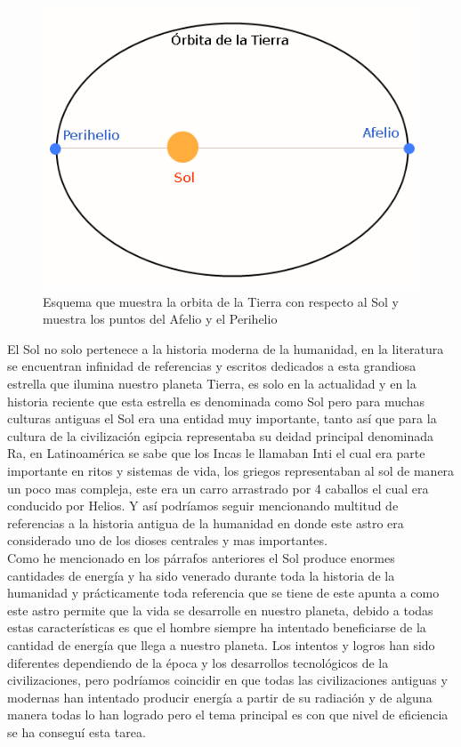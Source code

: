 \begin{figure}[h!]
        \centering
        \includegraphics[scale=0.4]{images/afelioPerihelio}
        \caption{\tiny Esquema que muestra la orbita de la Tierra con respecto al Sol y muestra los puntos del Afelio y el Perihelio}
\end{figure}

El Sol no solo pertenece a la historia moderna de la humanidad, en la literatura se encuentran infinidad de referencias y escritos dedicados a esta grandiosa estrella que ilumina nuestro planeta Tierra, es solo en la actualidad y en la historia reciente que esta estrella es denominada como Sol pero para muchas culturas antiguas el Sol era una entidad muy importante, tanto así que para la cultura de la civilización egipcia representaba su deidad principal denominada Ra, en Latinoamérica se sabe que los Incas le llamaban Inti el cual era parte importante en ritos y sistemas de vida, los griegos representaban al sol de manera un poco mas compleja, este era un carro arrastrado por 4 caballos el cual era conducido por Helios. Y así podríamos seguir mencionando multitud de referencias a la historia antigua de la humanidad en donde este astro era considerado uno de los dioses centrales y mas importantes.\\ 

Como he mencionado en los párrafos anteriores el Sol produce enormes cantidades de energía y ha sido venerado durante toda la historia de la humanidad y prácticamente toda referencia que se tiene de este apunta a como este astro permite que la vida se desarrolle en nuestro planeta, debido a todas estas características es que el hombre siempre ha intentado beneficiarse de la cantidad de energía que llega a nuestro planeta. Los intentos y logros han sido diferentes dependiendo de la época y los desarrollos tecnológicos de la civilizaciones, pero podríamos coincidir en que todas las civilizaciones antiguas y modernas han intentado producir energía a partir de su radiación y de alguna manera todas lo han logrado pero el tema principal es con que nivel de eficiencia se ha conseguí esta tarea.\\

